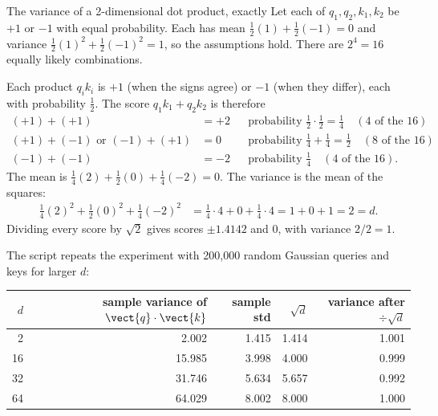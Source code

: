 \begin{worked}[label={we:attention:enum}]{The variance of a 2-dimensional dot product, exactly}
Let each of $q_1, q_2, k_1, k_2$ be $+1$ or $-1$ with equal probability. Each has mean
$\tfrac12(1) + \tfrac12(-1) = 0$ and variance $\tfrac12(1)^2 + \tfrac12(-1)^2 = 1$, so the
assumptions hold. There are $2^4 = 16$ equally likely combinations.

Each product $q_ik_i$ is $+1$ (when the signs agree) or $-1$ (when they differ), each with
probability $\tfrac12$. The score $q_1k_1 + q_2k_2$ is therefore
\begin{align*}
  (+1) + (+1) &= +2 && \text{probability } \tfrac12\cdot\tfrac12 = \tfrac14 \quad(4\text{ of the 16})\\
  (+1) + (-1) \text{ or } (-1) + (+1) &= 0 && \text{probability } \tfrac14 + \tfrac14 = \tfrac12 \quad(8\text{ of the 16})\\
  (-1) + (-1) &= -2 && \text{probability } \tfrac14 \quad(4\text{ of the 16}).
\end{align*}
The mean is $\tfrac14(2) + \tfrac12(0) + \tfrac14(-2) = 0$. The variance is the mean of the
squares:
\begin{align*}
  \tfrac14(2)^2 + \tfrac12(0)^2 + \tfrac14(-2)^2 &= \tfrac14\cdot4 + 0 + \tfrac14\cdot4 = 1 + 0 + 1 = 2 = d .
\end{align*}
Dividing every score by $\sqrt2$ gives scores $\pm1.4142$ and 0, with variance $2/2 = 1$.
\end{worked}

The script repeats the experiment with 200{,}000 random Gaussian queries and keys for larger
$d$\tagC:

\begin{center}
\begin{tabular}{rrrrr}
\toprule
$d$ & sample variance of $\vect{q}\cdot\vect{k}$ & sample std & $\sqrt d$ & variance after $\div\sqrt d$\\
\midrule
2 & 2.002 & 1.415 & 1.414 & 1.001\\
16 & 15.985 & 3.998 & 4.000 & 0.999\\
32 & 31.746 & 5.634 & 5.657 & 0.992\\
64 & 64.029 & 8.002 & 8.000 & 1.000\\
\bottomrule
\end{tabular}
\end{center}

